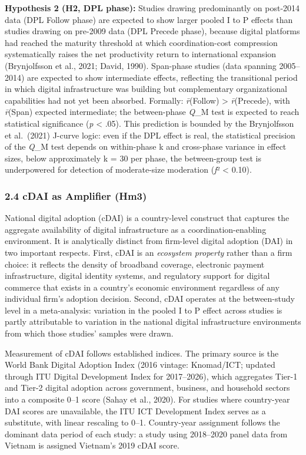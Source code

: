 \documentclass[
  12pt,a4paper]{article}
\begin{document}
\textbf{Hypothesis 2 (H2, DPL phase):} Studies drawing predominantly on
post-2014 data (DPL Follow phase) are expected to show larger pooled I
to P effects than studies drawing on pre-2009 data (DPL Precede phase),
because digital platforms had reached the maturity threshold at which
coordination-cost compression systematically raises the net productivity
return to international expansion (Brynjolfsson et al., 2021; David,
1990). Span-phase studies (data spanning 2005--2014) are expected to
show intermediate effects, reflecting the transitional period in which
digital infrastructure was building but complementary organizational
capabilities had not yet been absorbed. Formally: \emph{r̄}(Follow)
\textgreater{} \emph{r̄}(Precede), with \emph{r̄}(Span) expected
intermediate; the between-phase \emph{Q}\_M test is expected to reach
statistical significance (\emph{p} \textless{} .05). This prediction is
bounded by the Brynjolfsson et al.~(2021) J-curve logic: even if the DPL
effect is real, the statistical precision of the \emph{Q}\_M test
depends on within-phase k and cross-phase variance in effect sizes,
below approximately k = 30 per phase, the between-group test is
underpowered for detection of moderate-size moderation (\emph{f}²
\textless{} 0.10).

\hypertarget{cdai-as-amplifier-hm3}{%
\subsubsection{2.4 cDAI as Amplifier
(Hm3)}\label{cdai-as-amplifier-hm3}}

National digital adoption (cDAI) is a country-level construct that
captures the aggregate availability of digital infrastructure as a
coordination-enabling environment. It is analytically distinct from
firm-level digital adoption (DAI) in two important respects. First, cDAI
is an \emph{ecosystem property} rather than a firm choice: it reflects
the density of broadband coverage, electronic payment infrastructure,
digital identity systems, and regulatory support for digital commerce
that exists in a country's economic environment regardless of any
individual firm's adoption decision. Second, cDAI operates at the
between-study level in a meta-analysis: variation in the pooled I to P
effect across studies is partly attributable to variation in the
national digital infrastructure environments from which those studies'
samples were drawn.

Measurement of cDAI follows established indices. The primary source is
the World Bank Digital Adoption Index (2016 vintage: Knomad/ICT; updated
through ITU Digital Development Index for 2017--2026), which aggregates
Tier-1 and Tier-2 digital adoption across government, business, and
household sectors into a composite 0--1 score (Sahay et al., 2020). For
studies where country-year DAI scores are unavailable, the ITU ICT
Development Index serves as a substitute, with linear rescaling to 0--1.
Country-year assignment follows the dominant data period of each study:
a study using 2018--2020 panel data from Vietnam is assigned Vietnam's
2019 cDAI score.
\end{document}
